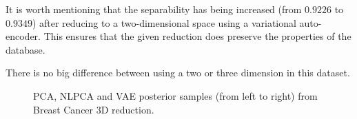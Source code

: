 It is worth mentioning that the separability has being increased (from \(0.9226\) to \(0.9349\)) after reducing to a two-dimensional space using a variational auto-encoder. This ensures that the given reduction does preserve the properties of the database.

There is no big difference between using a two or three dimension in this dataset.

\begin{figure}
  \centering
   \caption{PCA, NLPCA and VAE posterior samples (from left to right) from Breast Cancer 3D reduction.}\label{fig:breast_posterior_3D}
\end{figure}
